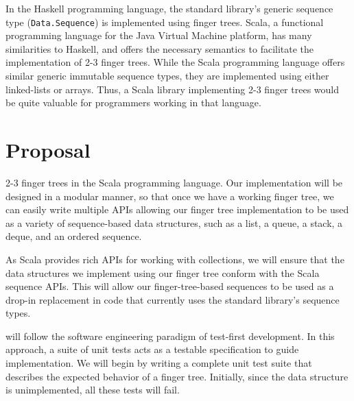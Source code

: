 \documentclass[a4paper,nobib]{tufte-handout}
\begin{document}
In the Haskell programming language, the standard library's generic sequence type (\Verb|Data.Sequence|) is implemented using finger trees.\cite[-1in]{data_sequence} Scala, a functional programming language for the Java Virtual Machine platform, has many similarities to Haskell,\cite{odersky2004overview} and offers the necessary semantics to facilitate the implementation of 2-3 finger trees. While the Scala programming language offers similar generic immutable sequence types, they are implemented using either linked-lists or arrays.\cite{scala_std} Thus, a Scala library implementing 2-3 finger trees would be quite valuable for programmers working in that language.

\section{Proposal}

 2-3 finger trees in the Scala programming language. Our implementation will be designed in a modular manner, so that once we have a working finger tree, we can easily write multiple APIs allowing our finger tree implementation to be used as a variety of sequence-based data structures, such as a list, a queue, a stack, a deque, and an ordered sequence.

As Scala provides rich APIs for working with collections, we will ensure that the data structures we implement using our finger tree conform with the Scala sequence APIs. This will allow our finger-tree-based sequences to be used as a drop-in replacement in code that currently uses the standard library's sequence types. 

 will follow the software engineering paradigm of test-first development. In this approach, a suite of unit tests acts as a testable specification to guide implementation. We will begin by writing a complete unit test suite that describes the expected behavior of a finger tree. Initially, since the data structure is unimplemented, all these tests will fail. 




\end{document}
